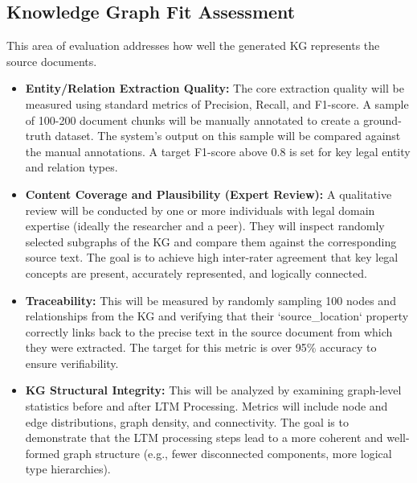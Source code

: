 \subsection{Knowledge Graph Fit Assessment}
This area of evaluation addresses how well the generated KG represents the source documents.
\begin{itemize}
    \item \textbf{Entity/Relation Extraction Quality:} The core extraction quality will be measured using standard metrics of Precision, Recall, and F1-score. A sample of 100-200 document chunks will be manually annotated to create a ground-truth dataset. The system's output on this sample will be compared against the manual annotations. A target F1-score above 0.8 is set for key legal entity and relation types.
    \item \textbf{Content Coverage and Plausibility (Expert Review):} A qualitative review will be conducted by one or more individuals with legal domain expertise (ideally the researcher and a peer). They will inspect randomly selected subgraphs of the KG and compare them against the corresponding source text. The goal is to achieve high inter-rater agreement that key legal concepts are present, accurately represented, and logically connected.
    \item \textbf{Traceability:} This will be measured by randomly sampling 100 nodes and relationships from the KG and verifying that their `source\_location` property correctly links back to the precise text in the source document from which they were extracted. The target for this metric is over 95\% accuracy to ensure verifiability.
    \item \textbf{KG Structural Integrity:} This will be analyzed by examining graph-level statistics before and after LTM Processing. Metrics will include node and edge distributions, graph density, and connectivity. The goal is to demonstrate that the LTM processing steps lead to a more coherent and well-formed graph structure (e.g., fewer disconnected components, more logical type hierarchies).
\end{itemize}

